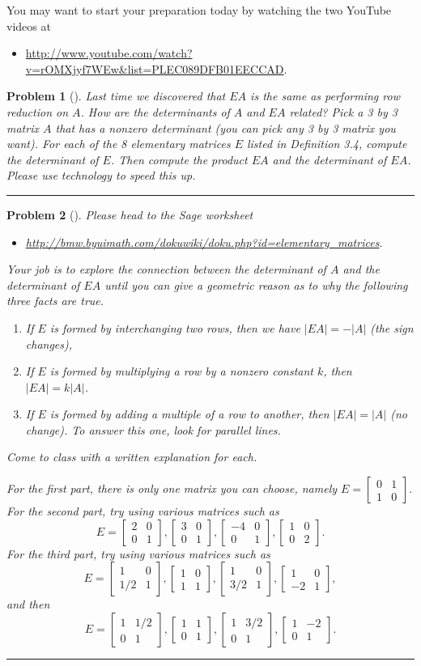 \documentclass[letterpaper,oneside]{book}%
\theoremstyle{plain}
\theoremstyle{box}
\theoremstyle{problem}
\newtheorem{problemnum}{Problem}[chapter]
\newenvironment{problem}[1][]{\begin{problemnum}[#1]}{\end{problemnum}\nopagebreak\hrule\bigskip}
\newcommand{\bvec}[1]{\begin{bmatrix} #1 \end{bmatrix}}
\begin{document}
You may want to start your preparation today by watching the two YouTube videos at 
\begin{itemize}
 \item \href{http://www.youtube.com/watch?v=rOMXjyf7WEw\&list=PLEC089DFB01EECCAD}{http://www.youtube.com/watch?v=rOMXjyf7WEw\&list=PLEC089DFB01EECCAD}.
\end{itemize}


\begin{problem}
 Last time we discovered that $EA$ is the same as performing row reduction on $A$.  How are the determinants of $A$ and $EA$ related? Pick a 3 by 3 matrix $A$ that has a nonzero determinant (you can pick any 3 by 3 matrix you want).  For each of the 8 elementary matrices $E$ listed in Definition 3.4, compute the determinant of $E$.  Then compute the product $EA$ and the determinant of $EA$.  Please use technology to speed this up.
\end{problem}

\begin{problem}
 Please head to the Sage worksheet 
 \begin{itemize}
  \item \href{http://bmw.byuimath.com/dokuwiki/doku.php?id=elementary\_matrices}{http://bmw.byuimath.com/dokuwiki/doku.php?id=elementary\_matrices}.  
 \end{itemize}
 Your job is to explore the connection between the determinant of $A$ and the determinant of $EA$ until you can give a geometric reason as to why the following three facts are true.  
 \begin{enumerate}
  \item  If $E$ is formed by interchanging two rows, then we have $|EA|=-|A|$ (the sign changes),
  \item  If $E$ is formed by multiplying a row by a nonzero constant $k$, then $|EA|=k|A|$.
  \item  If $E$ is formed by adding a multiple of a row to another, then $|EA|=|A|$ (no change). To answer this one, look for parallel lines.
 \end{enumerate}
Come to class with a written explanation for each.

For the first part, there is only one matrix you can choose, namely $E=\bvec{0&1\\1&0}$.  For the second part, try using various matrices such as
$$E=\bvec{2&0\\0&1},
\bvec{3&0\\0&1},
\bvec{-4&0\\0&1},
\bvec{1&0\\0&2}.$$
For the third part, try using various matrices such as
$$E=\bvec{1&0\\1/2&1},
\bvec{1&0\\1&1},
\bvec{1&0\\3/2&1},
\bvec{1&0\\-2&1},$$ 
and then 
$$E=\bvec{1&1/2\\0&1},
\bvec{1&1\\0&1},
\bvec{1&3/2\\0&1},
\bvec{1&-2\\0&1}.$$

\end{problem}
\end{document}
